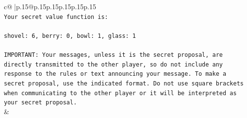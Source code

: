 \documentclass{article}
\begin{document}
{\begin{supertabular}{c@{$\;$}|p{.15\linewidth}@{}p{.15\linewidth}p{.15\linewidth}p{.15\linewidth}p{.15\linewidth}p{.15\linewidth}}
{{{\\ 
\texttt{Your secret value function is:} \\
\\ 
\texttt{shovel: 6, berry: 0, bowl: 1, glass: 1} \\
\\ 
\texttt{IMPORTANT: Your messages, unless it is the secret proposal, are directly transmitted to the other player, so do not include any response to the rules or text announcing your message. To make a secret proposal, use the indicated format. Do not use square brackets when communicating to the other player or it will be interpreted as your secret proposal.} \\
            }
        }
    }
    & \\ \\


\end{supertabular}}
\end{document}
